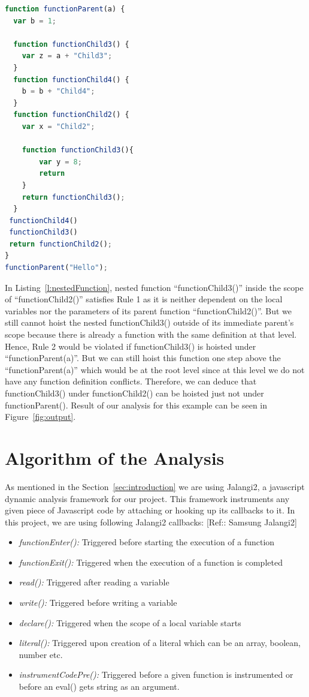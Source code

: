 \documentclass[authoryear,preprint]{sigplanconf}
\begin{document}
\begin{lstlisting}[float,caption= Nested Function Declaration Example ,label=l:nestedFunction,language=JavaScript]
function functionParent(a) {
  var b = 1;

  function functionChild3() { 
    var z = a + "Child3";
  }
  function functionChild4() { 
    b = b + "Child4";
  }
  function functionChild2() { 
    var x = "Child2";

    function functionChild3(){
        var y = 8;
        return
    }
    return functionChild3();
  }
 functionChild4()
 functionChild3()
 return functionChild2();
}
functionParent("Hello");
\end{lstlisting} 

In Listing~\ref{l:nestedFunction}, nested function \enquote{functionChild3()} inside the scope of \enquote{functionChild2()} satisfies Rule 1 as it is neither dependent on the local variables nor the parameters of its parent function \enquote{functionChild2()}. But we still cannot hoist the nested functionChild3() outside of its immediate parent's scope because there is already a function with the same definition at that level. Hence, Rule 2 would be violated if functionChild3() is hoisted under \enquote{functionParent(a)}. But we can still hoist this function one step above the \enquote{functionParent(a)} which would be at the root level since at this level we do not have any function definition conflicts. Therefore, we can deduce that functionChild3() under functionChild2() can be hoisted just not under functionParent(). Result of our analysis for this example can be seen in Figure~\ref{fig:output}.

\section{Algorithm of the Analysis}
\label{sec:algorithm}
As mentioned in the Section~\ref{sec:introduction} we are using Jalangi2, a javascript dynamic analysis framework for our project. This framework instruments any given piece of Javascript code by attaching or hooking up its callbacks to it. In this project, we are using following Jalangi2 callbacks: [Ref:: Samsung Jalangi2]

\begin{itemize}
 \item {\textit{functionEnter():}} Triggered before starting the execution of a function
 \item {\textit{functionExit():}} Triggered when the execution of a function is completed 
 \item {\textit{read():}} Triggered after reading a variable
 \item {\textit{write():}} Triggered before writing a variable
 \item {\textit{declare():}} Triggered when the scope of a local variable starts
 \item {\textit{literal():}} Triggered upon creation of a literal which can be an array, boolean, number etc.
  \item {\textit{instrumentCodePre():}} Triggered before a given function is instrumented or before an eval() gets string as an argument.
 \\
\end{itemize}
\end{document}
